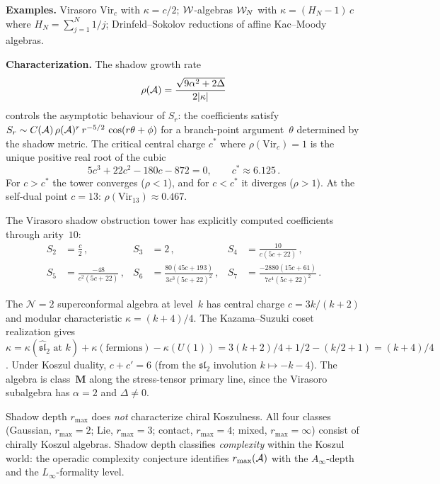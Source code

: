 \noindent\textbf{Examples.}
Virasoro $\mathrm{Vir}_c$ with $\kappa = c/2$;
$\mathcal{W}$-algebras $\mathcal{W}_N$ with $\kappa = (H_N - 1)\,c$ where
$H_N = \sum_{j=1}^{N} 1/j$;
Drinfeld--Sokolov reductions of affine Kac--Moody algebras.

\noindent\textbf{Characterization.}
The shadow growth rate
\[
\rho(\mathcal{A}) = \frac{\sqrt{9\alpha^2 + 2\Delta}}{2|\kappa|}
\]
controls the asymptotic behaviour of $S_r$: the coefficients satisfy
$S_r \sim C(\mathcal{A})\, \rho(\mathcal{A})^r\, r^{-5/2}\, \cos(r\theta + \phi)$
for a branch-point argument~$\theta$ determined by the shadow metric.
The critical central charge $c^*$ where $\rho(\mathrm{Vir}_c) = 1$ is the
unique positive real root of the cubic
\begin{equation}\label{eq:critical-cubic}
5c^3 + 22c^2 - 180c - 872 = 0,
\qquad
c^* \approx 6.125\,.
\end{equation}
For $c > c^*$ the tower converges ($\rho < 1$), and for $c < c^*$ it
diverges ($\rho > 1$). At the self-dual point $c = 13$:
$\rho(\mathrm{Vir}_{13}) \approx 0.467$.

The Virasoro shadow obstruction tower has explicitly computed coefficients through
arity~$10$:
\begin{align}
S_2 &= \tfrac{c}{2}\,, &
S_3 &= 2\,, &
S_4 &= \frac{10}{c(5c+22)}\,,
\label{eq:vir-S234} \\
S_5 &= \frac{-48}{c^2(5c+22)}\,, &
S_6 &= \frac{80(45c+193)}{3c^3(5c+22)^2}\,, &
S_7 &= \frac{-2880(15c+61)}{7c^4(5c+22)^2}\,.
\label{eq:vir-S567}
\end{align}

\medskip

\begin{remark}[$\mathcal{N}=2$ superconformal algebra]
\label{rem:n2-sca}
The $\mathcal{N}=2$ superconformal algebra at level~$k$ has
central charge $c = 3k/(k+2)$ and modular characteristic
$\kappa = (k+4)/4$. The Kazama--Suzuki coset realization
gives $\kappa = \kappa(\widehat{\mathfrak{sl}}_2 \text{ at }k)
+ \kappa(\text{fermions}) - \kappa(U(1))
= 3(k{+}2)/4 + 1/2 - (k/2{+}1) = (k+4)/4$.
Under Koszul duality, $c + c' = 6$ (from the $\mathfrak{sl}_2$
involution $k \mapsto -k - 4$). The algebra is class~$\mathbf{M}$
along the stress-tensor primary line, since the Virasoro subalgebra
has $\alpha = 2$ and $\Delta \neq 0$.
\end{remark}

\begin{remark}\label{rem:depth-vs-koszulness}
Shadow depth $r_{\max}$ does \emph{not} characterize chiral Koszulness.
All four classes (Gaussian, $r_{\max} = 2$; Lie, $r_{\max} = 3$;
contact, $r_{\max} = 4$; mixed, $r_{\max} = \infty$) consist
of chirally Koszul algebras. Shadow depth classifies \emph{complexity}
within the Koszul world: the operadic complexity conjecture
identifies $r_{\max}(\mathcal{A})$ with the $A_\infty$-depth and
the $L_\infty$-formality level.
\end{remark}

